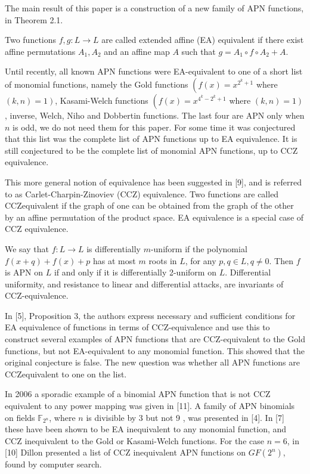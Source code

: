 \documentclass[10pt]{article}
\begin{document}
The main result of this paper is a construction of a new family of APN functions, in Theorem 2.1.

Two functions $f, g: L \longrightarrow L$ are called extended affine (EA) equivalent if there exist affine permutations $A_{1}, A_{2}$ and an affine map $A$ such that $g=A_{1} \circ f \circ A_{2}+A$.

Until recently, all known APN functions were EA-equivalent to one of a short list of monomial functions, namely the Gold functions $\left(f(x)=x^{2^{k}+1}\right.$ where $\left.(k, n)=1\right)$, Kasami-Welch functions $\left(f(x)=x^{4^{k}-2^{k}+1}\right.$ where $\left.(k, n)=1\right)$, inverse, Welch, Niho and Dobbertin functions. The last four are APN only when $n$ is odd, we do not need them for this paper. For some time it was conjectured that this list was the complete list of APN functions up to EA equivalence. It is still conjectured to be the complete list of monomial APN functions, up to CCZ equivalence.

This more general notion of equivalence has been suggested in [9], and is referred to as Carlet-Charpin-Zinoviev (CCZ) equivalence. Two functions are called CCZequivalent if the graph of one can be obtained from the graph of the other by an affine permutation of the product space. EA equivalence is a special case of CCZ equivalence.

We say that $f: L \longrightarrow L$ is differentially $m$-uniform if the polynomial $f(x+q)+ f(x)+p$ has at most $m$ roots in $L$, for any $p, q \in L, q \neq 0$. Then $f$ is APN on $L$ if and only if it is differentially 2-uniform on $L$. Differential uniformity, and resistance to linear and differential attacks, are invariants of CCZ-equivalence.

In [5], Proposition 3, the authors express necessary and sufficient conditions for EA equivalence of functions in terms of CCZ-equivalence and use this to construct several examples of APN functions that are CCZ-equivalent to the Gold functions, but not EA-equivalent to any monomial function. This showed that the original conjecture is false. The new question was whether all APN functions are CCZequivalent to one on the list.

In 2006 a sporadic example of a binomial APN function that is not CCZ equivalent to any power mapping was given in [11]. A family of APN binomials on fields $\mathbb{F}_{2^{n}}$, where $n$ is divisible by 3 but not 9 , was presented in [4]. In [7] these have been shown to be EA inequivalent to any monomial function, and CCZ inequivalent to the Gold or Kasami-Welch functions. For the case $n=6$, in [10] Dillon presented a list of CCZ inequivalent APN functions on $G F\left(2^{n}\right)$, found by computer search.
\end{document}

